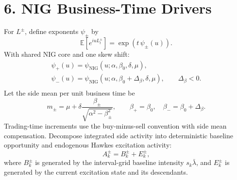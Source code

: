 \documentclass[11pt]{article}
\begin{document}
    \section*{6. NIG Business-Time Drivers}
    For \(L^\pm\), define exponents \(\psi_\pm\) by
    \[
        \mathbb{E}\!\left[e^{iuL_t^\pm}\right]=\exp\!\left(t\,\psi_\pm(u)\right).
    \]
    With shared NIG core and one skew shift:
    \begin{gather*}
        \psi_+(u)=\psi_{\mathrm{NIG}}(u;\alpha,\beta_0,\delta,\mu),\\
        \psi_-(u)=\psi_{\mathrm{NIG}}(u;\alpha,\beta_0+\Delta_\beta,\delta,\mu),
        \qquad
        \Delta_\beta<0.\\
    \end{gather*}
    Let the side mean per unit business time be
    \[
        m_\pm=\mu+\delta\frac{\beta_\pm}{\sqrt{\alpha^2-\beta_\pm^2}},
        \qquad
        \beta_+=\beta_0,\quad \beta_-=\beta_0+\Delta_\beta.
    \]
    Trading-time increments use the buy-minus-sell convention with side mean compensation.
    Decompose integrated side activity into deterministic baseline opportunity and endogenous
    Hawkes excitation activity:
    \[
        A_k^\pm = B_k^\pm + E_k^\pm,
    \]
    where \(B_k^\pm\) is generated by the interval-grid baseline intensity
    \(s_k\bar{\lambda}\), and \(E_k^\pm\) is generated by the current
    excitation state and its descendants.
\end{document}
